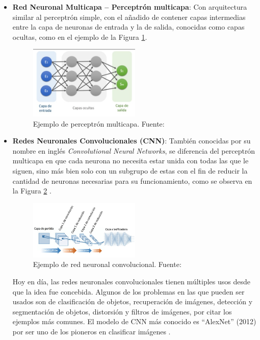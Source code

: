 \begin{itemize}
\begin{itemize}
		\item \textbf{Red Neuronal Multicapa – Perceptrón multicapa}: Con arquitectura similar al perceptrón simple, con el añadido de contener capas intermedias entre la capa de neuronas de entrada y la de salida, conocidas como capas ocultas, como en el ejemplo de la Figura \ref{2:fig21}.
		\begin{figure}[h]
			\begin{center}
				\includegraphics[width=0.50\textwidth]{2/figures/perceptron_multicapa.jpg}
				\caption{Ejemplo de perceptrón multicapa. Fuente: \cite{gl_calvo2017clasifrna}}
				\label{2:fig21}
			\end{center}
		\end{figure}
		
		\item \textbf{Redes Neuronales Convolucionales (CNN)}: También conocidas por su nombre en inglés \textit{Convolutional Neural Networks}, se diferencia del perceptrón multicapa en que cada neurona no necesita estar unida con todas las que le siguen, sino más bien solo con un subgrupo de estas con el fin de reducir la cantidad de neuronas necesarias para su funcionamiento, como se observa en la Figura \ref{2:fig22} \parencite{gl_calvo2017clasifrna}.
		\begin{figure}[h]
			\begin{center}
				\includegraphics[width=0.50\textwidth]{2/figures/cnn.jpg}
				\caption{Ejemplo de red neuronal convolucional. Fuente: \cite{gl_calvo2017clasifrna}}
				\label{2:fig22}
			\end{center}
		\end{figure}
		
		Hoy en día, las redes neuronales convolucionales tienen múltiples usos desde que la idea fue concebida. Algunos de los problemas en las que pueden ser usados son de clasificación de objetos, recuperación de imágenes, detección y segmentación de objetos, distorsión y filtros de imágenes, por citar los ejemplos más comunes. El modelo de CNN más conocido es “AlexNet” (2012) por ser uno de los pioneros en clasificar imágenes \parencite{tec_li2019cnn}.
		

\end{itemize}
\end{itemize}
